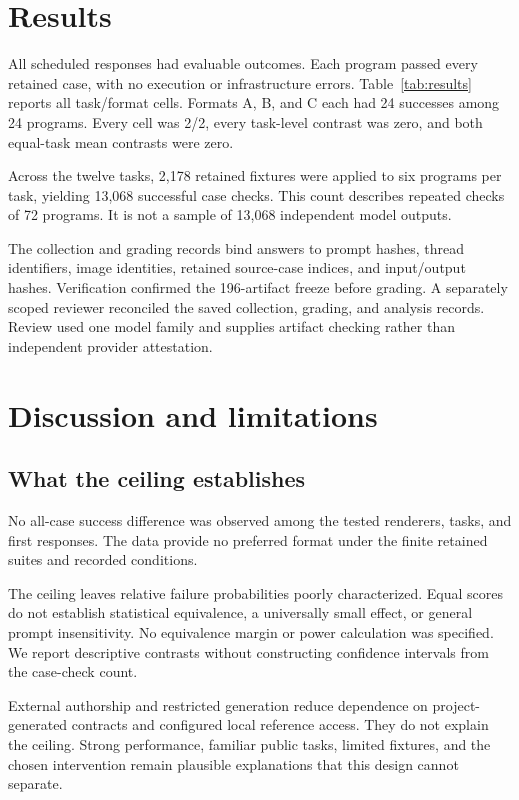 \documentclass[conference,a4paper]{IEEEtran}
\begin{document}
\section{Results}
All scheduled responses had evaluable outcomes. Each program passed every retained case, with no execution or infrastructure errors. Table~\ref{tab:results} reports all task/format cells. Formats A, B, and C each had 24 successes among 24 programs. Every cell was 2/2, every task-level contrast was zero, and both equal-task mean contrasts were zero.



Across the twelve tasks, 2,178 retained fixtures were applied to six programs per task, yielding 13,068 successful case checks. This count describes repeated checks of 72 programs. It is not a sample of 13,068 independent model outputs.

The collection and grading records bind answers to prompt hashes, thread identifiers, image identities, retained source-case indices, and input/output hashes. Verification confirmed the 196-artifact freeze before grading. A separately scoped reviewer reconciled the saved collection, grading, and analysis records. Review used one model family and supplies artifact checking rather than independent provider attestation.

\section{Discussion and limitations}
\subsection{What the ceiling establishes}
No all-case success difference was observed among the tested renderers, tasks, and first responses. The data provide no preferred format under the finite retained suites and recorded conditions.

The ceiling leaves relative failure probabilities poorly characterized. Equal scores do not establish statistical equivalence, a universally small effect, or general prompt insensitivity. No equivalence margin or power calculation was specified. We report descriptive contrasts without constructing confidence intervals from the case-check count.

External authorship and restricted generation reduce dependence on project-generated contracts and configured local reference access. They do not explain the ceiling. Strong performance, familiar public tasks, limited fixtures, and the chosen intervention remain plausible explanations that this design cannot separate.
\end{document}
